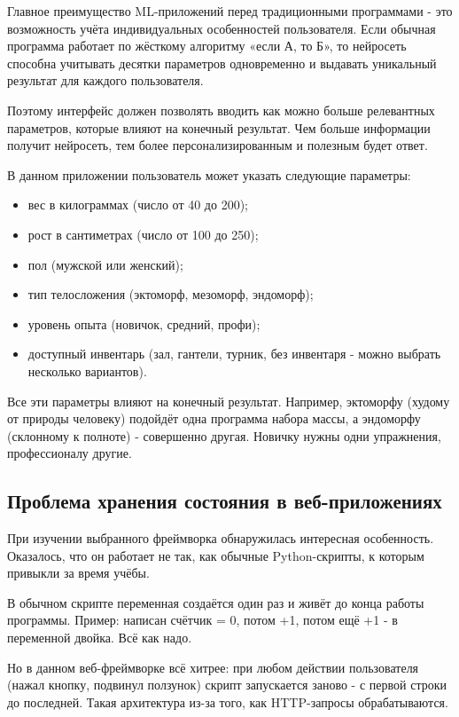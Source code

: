 \documentclass[14pt, a4paper]{extarticle}
\begin{document}
\begin{enumerate}
\noindent Главное преимущество ML-приложений перед традиционными программами - это возможность учёта индивидуальных особенностей пользователя. Если обычная программа работает по жёсткому алгоритму «если А, то Б», то нейросеть способна учитывать десятки параметров одновременно и выдавать уникальный результат для каждого пользователя.

\medskip
\noindent Поэтому интерфейс должен позволять вводить как можно больше релевантных параметров, которые влияют на конечный результат. Чем больше информации получит нейросеть, тем более персонализированным и полезным будет ответ.

\medskip
\noindent В данном приложении пользователь может указать следующие параметры:
\begin{itemize}
\item вес в килограммах (число от 40 до 200);
\item рост в сантиметрах (число от 100 до 250);
\item пол (мужской или женский);
\item тип телосложения (эктоморф, мезоморф, эндоморф);
\item уровень опыта (новичок, средний, профи);
\item доступный инвентарь (зал, гантели, турник, без инвентаря - можно выбрать несколько вариантов).
\end{itemize}

\noindent Все эти параметры влияют на конечный результат. Например, эктоморфу (худому от природы человеку) подойдёт одна программа набора массы, а эндоморфу (склонному к полноте) - совершенно другая. Новичку нужны одни упражнения, профессионалу другие.

\subsection{Проблема хранения состояния в веб-приложениях}

\noindent При изучении выбранного фреймворка обнаружилась интересная особенность. Оказалось, что он работает не так, как обычные Python-скрипты, к которым привыкли за время учёбы.

\medskip
\noindent В обычном скрипте переменная создаётся один раз и живёт до конца работы программы. Пример: написан счётчик = 0, потом +1, потом ещё +1 - в переменной двойка. Всё как надо.

\medskip
\noindent Но в данном веб-фреймворке всё хитрее: при любом действии пользователя (нажал кнопку, подвинул ползунок) скрипт запускается заново - с первой строки до последней. Такая архитектура из-за того, как HTTP-запросы обрабатываются.


\end{enumerate}
\end{document}
